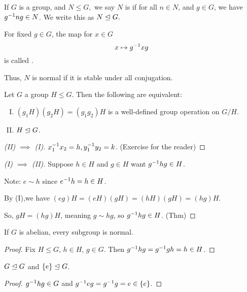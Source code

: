 \documentclass[notes.tex]{subfiles}
\begin{document}
\begin{defn}
	If $G$ is a group, and $N\le G,$ we say $N$ is  if for all $n\in N$, and $g\in G$, we have ${g}^{-1}ng\in N$. We write this as $N\trianglelefteq G.$ 
\end{defn}
\begin{remark}
	For fixed $g\in G$, the map for $x\in G$ \[
		x\mapsto {g}^{-1}xg
	\]
	is called .
\end{remark}

Thus, $N$ is normal if it is stable under all conjugation.

\begin{theorem}
	Let $G$ a group $H\le G$. Then the following are equivalent:
	
	\begin{enumerate}[(I)]
		\item $(g_1H)(g_2H) = (g_1g_2)H$ is a well-defined group operation on $G/H$.
		\item $H\trianglelefteq G$.
	\end{enumerate}
	\begin{proof}[(II) $\implies$ (I)]
		${x}^{-1}_1x_2=h, {y}^{-1}_1y_2=k$. (Exercise for the reader) %
 	\end{proof}
	\begin{proof}[(I) $\implies$ (II)]
		Suppose $h\in H$ and $g\in H$
		want ${g}^{-1}hg\in H$.

		Note: $e\sim h$ since ${e}^{-1}h=h\in H$.

		By (I),we have $ (eg)H =(eH)(gH) = (hH)(gH) = (hg)H$.

		So, $gH = (hg)H$, meaning $g\sim hg$, so ${g}^{-1}hg\in H$. \qedhere(Thm)
	\end{proof}
\end{theorem}

\begin{proposition}
	If $G$ is abelian, every subgroup is normal.
\end{proposition}

\begin{proof}
	Fix $H\le G$, $h\in H$, $g\in G.$
	Then ${g}^{-1}hg = {g}^{-1}gh =h\in H$.
\end{proof}

\begin{proposition}
	$G\trianglelefteq G$ and $\{e\}\trianglelefteq G$.
\end{proposition}
\begin{proof}
	${g}^{-1}hg \in G$ and ${g}^{-1}eg = {g}^{-1}g = e\in \{e\}$.
\end{proof}
\end{document}
